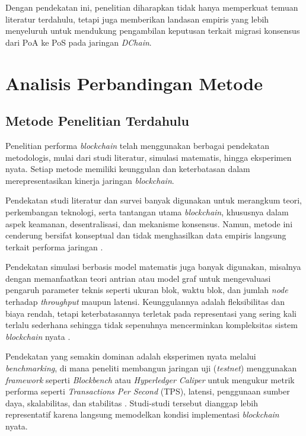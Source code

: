 Dengan pendekatan ini, penelitian diharapkan tidak hanya memperkuat temuan literatur terdahulu, tetapi juga memberikan landasan empiris yang lebih menyeluruh untuk mendukung pengambilan keputusan terkait migrasi konsensus dari PoA ke PoS pada jaringan \textit{DChain}.


\section{Analisis Perbandingan Metode}

\subsection{Metode Penelitian Terdahulu}

Penelitian performa \textit{blockchain} telah menggunakan berbagai pendekatan metodologis, mulai dari studi literatur, simulasi matematis, hingga eksperimen nyata. Setiap metode memiliki keunggulan dan keterbatasan dalam merepresentasikan kinerja jaringan \textit{blockchain}.

Pendekatan studi literatur dan survei banyak digunakan untuk merangkum teori, perkembangan teknologi, serta tantangan utama \textit{blockchain}, khususnya dalam aspek keamanan, desentralisasi, dan mekanisme konsensus. Namun, metode ini cenderung bersifat konseptual dan tidak menghasilkan data empiris langsung terkait performa jaringan \cite{fan2020, dabbagh2021, bamakan2020}.

Pendekatan simulasi berbasis model matematis juga banyak digunakan, misalnya dengan memanfaatkan teori antrian atau model graf untuk mengevaluasi pengaruh parameter teknis seperti ukuran blok, waktu blok, dan jumlah \textit{node} terhadap \textit{throughput} maupun latensi. Keunggulannya adalah fleksibilitas dan biaya rendah, tetapi keterbatasannya terletak pada representasi yang sering kali terlalu sederhana sehingga tidak sepenuhnya mencerminkan kompleksitas sistem \textit{blockchain} nyata \cite{xu2021, zhou2020, shahsavari2022, huang2018}.

Pendekatan yang semakin dominan adalah eksperimen nyata melalui \textit{benchmarking}, di mana peneliti membangun jaringan uji (\textit{testnet}) menggunakan \textit{framework} seperti \textit{Blockbench} atau \textit{Hyperledger Caliper} untuk mengukur metrik performa seperti \textit{Transactions Per Second} (TPS), latensi, penggunaan sumber daya, skalabilitas, dan stabilitas \cite{dinh2017, esmaili2024, abreu2022, misra2021}. Studi-studi tersebut dianggap lebih representatif karena langsung memodelkan kondisi implementasi \textit{blockchain} nyata.


